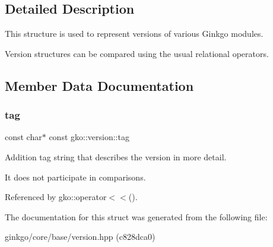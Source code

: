 \subsection{Detailed Description}
This structure is used to represent versions of various Ginkgo modules. 

Version structures can be compared using the usual relational operators. 

\subsection{Member Data Documentation}
\mbox{\label{structgko_1_1version_a1bd0eaa4d551c145ff9cd0c10e555ac3}} 
\subsubsection{\texorpdfstring{tag}{tag}}
{\footnotesize\ttfamily const char$\ast$ const gko\+::version\+::tag}



Addition tag string that describes the version in more detail. 

It does not participate in comparisons. 

Referenced by gko\+::operator$<$$<$().



The documentation for this struct was generated from the following file\+:\begin{DoxyCompactItemize}
\item 
ginkgo/core/base/version.\+hpp (c828dca0)\end{DoxyCompactItemize}
